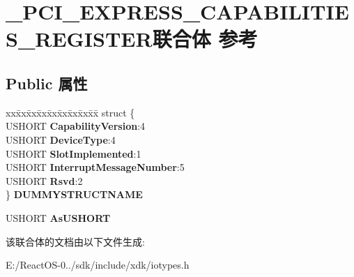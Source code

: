 \hypertarget{union___p_c_i___e_x_p_r_e_s_s___c_a_p_a_b_i_l_i_t_i_e_s___r_e_g_i_s_t_e_r}{}\section{\+\_\+\+P\+C\+I\+\_\+\+E\+X\+P\+R\+E\+S\+S\+\_\+\+C\+A\+P\+A\+B\+I\+L\+I\+T\+I\+E\+S\+\_\+\+R\+E\+G\+I\+S\+T\+E\+R联合体 参考}
\label{union___p_c_i___e_x_p_r_e_s_s___c_a_p_a_b_i_l_i_t_i_e_s___r_e_g_i_s_t_e_r}
\subsection*{Public 属性}
\begin{DoxyCompactItemize}
\item 
\mbox{\label{union___p_c_i___e_x_p_r_e_s_s___c_a_p_a_b_i_l_i_t_i_e_s___r_e_g_i_s_t_e_r_acce146462da1095485e5f647b7b22939}} 
\begin{tabbing}
xx\=xx\=xx\=xx\=xx\=xx\=xx\=xx\=xx\=\kill
struct \{\\
\>USHORT {\bfseries CapabilityVersion}:4\\
\>USHORT {\bfseries DeviceType}:4\\
\>USHORT {\bfseries SlotImplemented}:1\\
\>USHORT {\bfseries InterruptMessageNumber}:5\\
\>USHORT {\bfseries Rsvd}:2\\
\} {\bfseries DUMMYSTRUCTNAME}\\

\end{tabbing}\item 
\mbox{\label{union___p_c_i___e_x_p_r_e_s_s___c_a_p_a_b_i_l_i_t_i_e_s___r_e_g_i_s_t_e_r_a407bf48233f7beaa8cdef8bc73d48859}} 
U\+S\+H\+O\+RT {\bfseries As\+U\+S\+H\+O\+RT}
\end{DoxyCompactItemize}


该联合体的文档由以下文件生成\+:\begin{DoxyCompactItemize}
\item 
E\+:/\+React\+O\+S-\/0../sdk/include/xdk/iotypes.\+h\end{DoxyCompactItemize}
